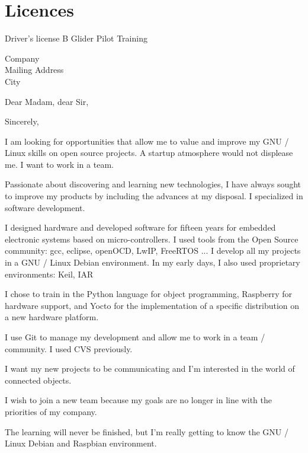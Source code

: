 \documentclass[11pt,a4paper,sans]{moderncv}   %
\begin{document}
\renewcommand{\listitemsymbol}{-~}            %

\section{Licences}
 {Driver's license  B}
 {}
 {Glider Pilot Training}

\clearpage
 {Company \\ Mailing Address \\ City}
\date{December 4 2017}
\opening{Dear Madam, dear Sir,}
\closing{Sincerely,}
\makelettertitle

    I am looking for opportunities that allow me to value and improve my GNU / Linux skills on open source projects. A startup atmosphere would not displease me. I want to work in a team.
    
    Passionate about discovering and learning new technologies, I have always sought to improve my products by including the advances at my disposal. I specialized in software development.

    I designed hardware and developed software for fifteen years for embedded electronic systems based on micro-controllers. I used tools from the Open Source community: gcc, eclipse, openOCD, LwIP, FreeRTOS ... I develop all my projects in a GNU / Linux Debian environment. In my early days, I also used proprietary environments: Keil, IAR

    I chose to train in the Python language for object programming, Raspberry for hardware support, and Yocto for the implementation of a specific distribution on a new hardware platform.

    I use Git to manage my development and allow me to work in a team / community. I used CVS previously.
    
    I want my new projects to be communicating and I'm interested in the world of connected objects.
    
    I wish to join a new team because my goals are no longer in line with the priorities of my company.

    The learning will never be finished, but I'm really getting to know the GNU / Linux Debian and Raspbian environment.

\makeletterclosing
\end{document}
